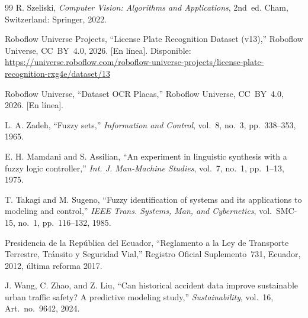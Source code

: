 \documentclass[11pt]{article}
\begin{document}
{\begin{thebibliography}{99}
    R. Szeliski, \emph{Computer Vision: Algorithms and Applications}, 2nd~ed. Cham,
    Switzerland: Springer, 2022.

    Roboflow Universe Projects, ``License Plate Recognition Dataset (v13),'' Roboflow
    Universe, CC~BY~4.0, 2026. [En línea]. Disponible:
    \url{https://universe.roboflow.com/roboflow-universe-projects/license-plate-recognition-rxg4e/dataset/13}

    Roboflow Universe, ``Dataset OCR Placas,'' Roboflow Universe, CC~BY~4.0, 2026.
    [En línea].

    L. A. Zadeh, ``Fuzzy sets,'' \emph{Information and Control}, vol.~8, no.~3,
    pp.~338--353, 1965.

    E. H. Mamdani and S. Assilian, ``An experiment in linguistic synthesis with a fuzzy
    logic controller,'' \emph{Int. J. Man-Machine Studies}, vol.~7, no.~1, pp.~1--13,
    1975.

    T. Takagi and M. Sugeno, ``Fuzzy identification of systems and its applications to
    modeling and control,'' \emph{IEEE Trans. Systems, Man, and Cybernetics},
    vol.~SMC-15, no.~1, pp.~116--132, 1985.

    Presidencia de la República del Ecuador, ``Reglamento a la Ley de Transporte
    Terrestre, Tránsito y Seguridad Vial,'' Registro Oficial Suplemento~731, Ecuador,
    2012, última reforma 2017.

    J. Wang, C. Zhao, and Z. Liu, ``Can historical accident data improve sustainable
    urban traffic safety? A predictive modeling study,'' \emph{Sustainability}, vol.~16,
    Art.~no.~9642, 2024.

    \end{thebibliography}
}
\end{document}
